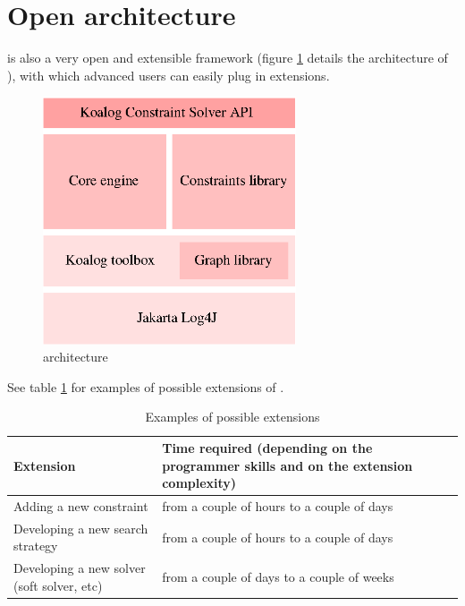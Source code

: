 \documentclass[twocolumn,a4paper,11pt]{article}
\begin{document}
\section*{\color{Blue}Open architecture}

{\jcs} is also a very open and extensible framework (figure \ref{fig:archi}
details the architecture of {\jcs}), 
with which advanced users can easily plug in extensions. 
\begin{figure}[htb]
\begin{center}
\includegraphics[width=7.5cm]{../archi}
\caption{\label{fig:archi}{\jcs} architecture}
\end{center}
\end{figure}
See table \ref{tab:extensions} for
examples of possible extensions of {\jcs}.
\begin{table}[htb]
\begin{center}
\begin{tabular}{|p{3cm}|p{4cm}|}
\hline
{\bf Extension}                                                 & {\bf Time
  required} (depending on the programmer skills and on the extension complexity)\\
\hline
\hline
Adding a new constraint                                         & from a couple of hours to a couple of days\\
\hline
Developing a new search strategy                                & from a couple of hours to a couple of days\\
\hline
Developing a new solver (soft solver, etc)                      & from a couple of days to a couple of weeks\\
\hline
\end{tabular}
\caption{\label{tab:extensions}Examples of {\jcs} possible extensions}
\end{center}
\end{table}
\end{document}
